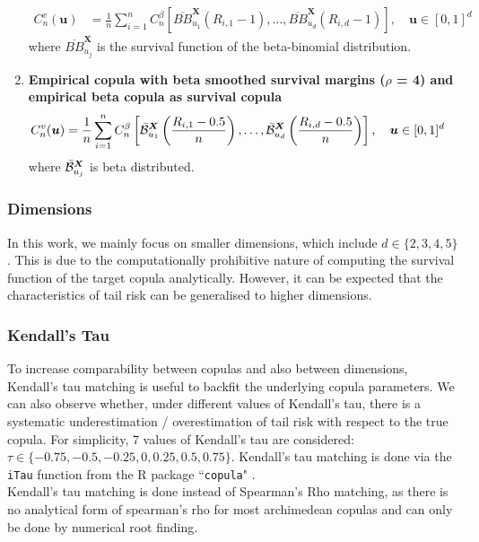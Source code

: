 \documentclass[12pt]{report}
\newcommand{\1}{\mathbf{1}}
\begin{document}
\begin{flushleft}
\begin{enumerate}
\begin{align*}
C_{n}^{v}(\boldsymbol{u}) &= \frac{1}{n} \sum\limits_{i = 1}^{n} C_{n}^{\beta} \left[\overline{BB}_{u_{1}}^{\boldsymbol{X}}\left(R_{i,1} - 1\right), \dots, \overline{BB}_{u_{d}}^{\boldsymbol{X}}\left(R_{i,d} - 1\right) \right], \quad \boldsymbol{u} \in [0,1]^{d}
\end{align*}
where $\overline{BB}_{u_{j}}^{\boldsymbol{X}}$ is the survival function of the beta-binomial distribution.
\item \textbf{Empirical copula with beta smoothed survival margins ($\rho$ = 4) and empirical beta copula as survival copula}
\begin{align*}
C_{n}^{v}(\boldsymbol{u}) &= \frac{1}{n} \sum\limits_{i = 1}^{n} C_{n}^{\beta} \left[\Bar{\mathcal{B}}_{u_{1}}^{\boldsymbol{X}}\left(\frac{R_{i,1} - 0.5}{n}\right), \dots, \Bar{\mathcal{B}}_{u_{d}}^{\boldsymbol{X}}\left(\frac{R_{i,d} - 0.5}{n}\right) \right], \quad \boldsymbol{u} \in [0,1]^{d}
\end{align*}
where $\Bar{\mathcal{B}}_{u_{j}}^{\boldsymbol{X}}$ is beta distributed.
\end{enumerate}

\subsubsection{Dimensions}

In this work, we mainly focus on smaller dimensions, which include $d \in \{ 2, 3, 4, 5 \}$. This is due to the computationally prohibitive nature of computing the survival function of the target copula analytically. However, it can be expected that the characteristics of tail risk can be generalised to higher dimensions.

\subsubsection{Kendall's Tau}
To increase comparability between copulas and also between dimensions, Kendall's tau matching is useful to backfit the underlying copula parameters. We can also observe whether, under different values of Kendall's tau, there is a systematic underestimation / overestimation of tail risk with respect to the true copula. For simplicity, 7 values of Kendall's tau are considered: $\tau \in \{ -0.75, -0.5, -0.25, 0, 0.25, 0.5, 0.75 \}$. Kendall's tau matching is done via the \texttt{iTau} function from the  \textsf{R} package ``\texttt{copula}" \parencite{copulaRPackage2023}. \\
\vspace{0.5cm}
Kendall's tau matching is done instead of Spearman's Rho matching, as there is no analytical form of spearman's rho for most archimedean copulas and can only be done by numerical root finding.


\end{flushleft}
\end{document}
